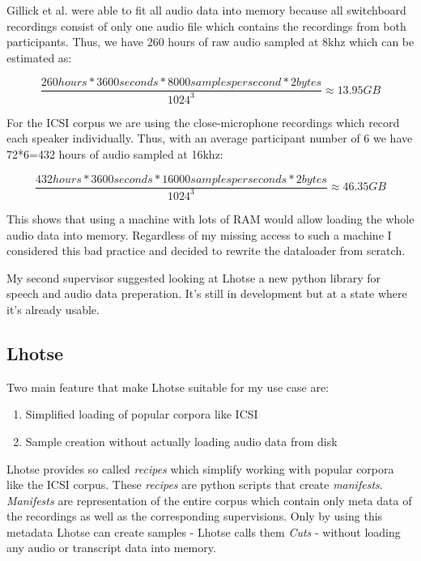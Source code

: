 \documentclass[bsc,frontabs,parskip,deptreport]{infthesis}
\begin{document}
Gillick et al. were able to fit all audio data into memory because all switchboard recordings consist of only one audio file which contains the recordings from both participants. Thus, we have 260 hours of raw audio sampled at 8khz which can be estimated as:

\[ \frac{260hours * 3600 seconds * 8000 samples per second * 2 bytes}{1024^3} \approx 13.95 GB \]

For the ICSI corpus we are using the close-microphone recordings which record each speaker individually. Thus, with an average participant number of 6 we have 72*6=432 hours of audio sampled at 16khz:

\[ \frac{432 hours * 3600 seconds * 16000 samples per seconds * 2bytes}{1024^3} \approx 46.35 GB \]

This shows that using a machine with lots of RAM would allow loading the whole audio data into memory. 
Regardless of my missing access to such a machine I considered this bad practice and decided to rewrite the dataloader from scratch. 

My second supervisor suggested looking at Lhotse \citep{zelasko2021lhotse} a new python library for speech and audio data preperation. It's still in development but at a state where it's already usable.

\subsection{Lhotse}
Two main feature that make Lhotse suitable for my use case are:
\begin{enumerate}
    \item Simplified loading of popular corpora like ICSI
    \item Sample creation without actually loading audio data from disk
\end{enumerate}

Lhotse provides so called \textit{recipes} which simplify working with popular corpora like the ICSI corpus.
These \textit{recipes} are python scripts that create \textit{manifests}.
\textit{Manifests} are representation of the entire corpus which contain only meta data of the recordings as well as the corresponding supervisions. 
Only by using this metadata Lhotse can create samples - Lhotse calls them \textit{Cuts} - without loading any audio or transcript data into memory. 
\end{document}
